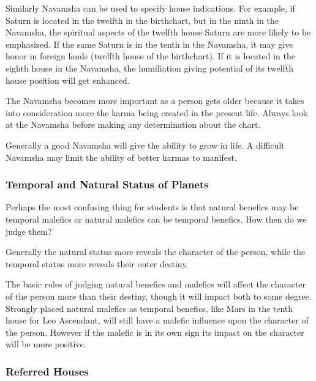  

Similarly Navamsha can be used to specify house indications. For example, if Saturn is located in the twelfth in the birthchart, but in the ninth in the Navamsha, the spiritual aspects of the twelfth house Saturn are more likely to be emphasized. If the same Saturn is in the tenth in the Navamsha, it may give honor in foreign lands (twelfth house of the birthchart). If it is located in the eighth house in the Navamsha, the humiliation giving potential of its twelfth house position will get enhanced.

 

The Navamsha becomes more important as a person gets older because it takes into consideration more the karma being created in the present life. Always look at the Navamsha before making any determination about the chart.

 

Generally a good Navamsha will give the ability to grow in life. A difficult Navamsha may limit the ability of better karmas to manifest.

 

\subsubsection{Temporal and Natural Status of Planets}
 

Perhaps the most confusing thing for students is that natural benefics may be temporal malefics or natural malefics can be temporal benefics. How then do we judge them?

 

Generally the natural status more reveals the character of the person, while the temporal status more reveals their outer destiny.

 

The basic rules of judging natural benefics and malefics will affect the character of the person more than their destiny, though it will impact both to some degree. Strongly placed natural malefics as temporal benefics, like Mars in the tenth house for Leo Ascendant, will still have a malefic influence upon the character of the person. However if the malefic is in its own sign its impact on the character will be more positive.

 

\subsubsection{Referred Houses}
 

